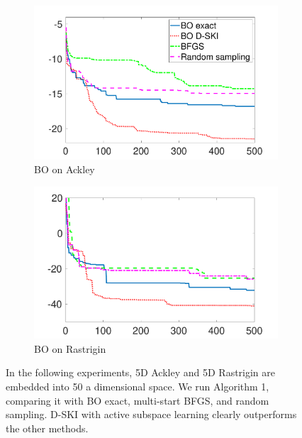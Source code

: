 \begin{figure}[ht]
  \begin{center}
    \begin{subfigure}{0.47\textwidth}
      \centering
      \captionsetup{justification=centering}
      \includegraphics[width=\textwidth,trim=1.5cm 0cm 1.5cm 1cm,clip]
      {./sgpd/pics/ackley_50_5}
      \caption{BO on Ackley}\label{fig:bo_ack}
    \end{subfigure}
    \begin{subfigure}{0.47\textwidth}
      \centering
      \captionsetup{justification=centering}
      \includegraphics[width=\textwidth,trim=1.5cm 0cm 1.5cm .5cm,clip]
      {./sgpd/pics/rastrigin_50_5}
      \caption{BO on Rastrigin}\label{fig:bo_ras}
    \end{subfigure}
    \caption{In the following experiments, 5D Ackley and 5D Rastrigin are
    embedded into 50 a dimensional space. We run Algorithm 1, comparing it with
    BO exact, multi-start BFGS, and random sampling. D-SKI with active subspace
    learning clearly outperforms the other methods.}\label{fig:bo}
  \end{center}
\end{figure}

